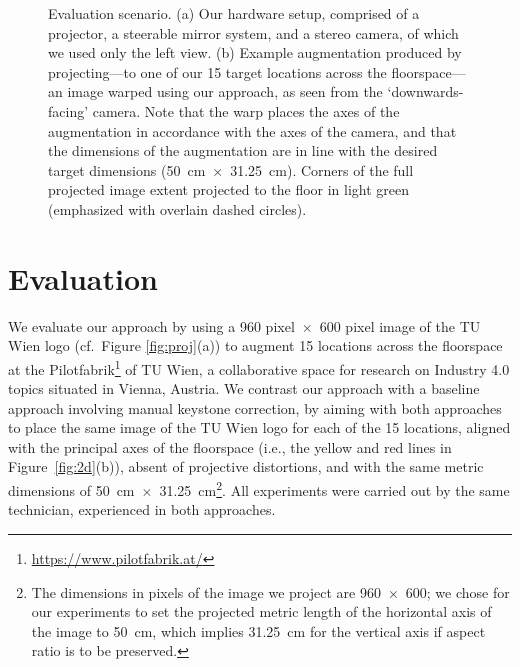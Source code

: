 \documentclass[review]{elsarticle}
\begin{document}
\begin{figure}
    \centering
    \quad
    \caption{Evaluation scenario. (a) Our hardware setup, comprised of a projector, a steerable mirror system, and a stereo camera, of which we used only the left view. (b) Example augmentation produced by projecting---to one of our 15 target locations across the floorspace---an image warped using our approach, as seen from the `downwards-facing' camera. Note that the warp places the axes of the augmentation in accordance with the axes of the camera, and that the dimensions of the augmentation are in line with the desired target dimensions (50~cm~$\times$~31.25~cm). Corners of the full projected image extent projected to the floor in light green (emphasized with overlain dashed circles).}
    \label{fig:eval}
\end{figure}

\section{Evaluation}
We evaluate our approach by using a 960 pixel~$\times$~600 pixel image of the TU Wien logo (cf.\ Figure \ref{fig:proj}(a)) to augment 15 locations across the floorspace at the Pilotfabrik\footnote{\url{https://www.pilotfabrik.at/}} of TU Wien, a collaborative space for research on Industry 4.0 topics situated in Vienna, Austria. We contrast our approach with a baseline approach involving manual keystone correction, by aiming with both approaches to place the same image of the TU Wien logo for each of the 15 locations, aligned with the principal axes of the floorspace (i.e., the yellow and red lines in Figure~\ref{fig:2d}(b)), absent of projective distortions, and with the same metric dimensions of 50~cm~$\times$~31.25~cm\footnote{The dimensions in pixels of the image we project are 960~$\times$~600; we chose for our experiments to set the projected metric length of the horizontal axis of the image to 50~cm, which implies 31.25~cm for the vertical axis if aspect ratio is to be preserved.}. All experiments were carried out by the same technician, experienced in both approaches.
\end{document}

